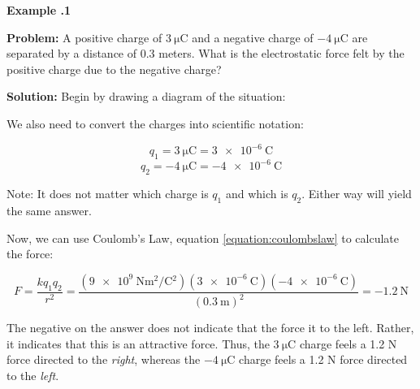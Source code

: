 	\begin{mdframed}[backgroundcolor=blue!10!white]
		\begin{center}
			
			
			\textbf{Example \thesection.1}	
		\end{center}
		\vspace{0.1in}
		\textbf{Problem: } A positive charge of $\SI{3}{\micro\coulomb}$ and a negative charge of $\SI{-4}{\micro\coulomb}$ are separated by a distance of 0.3 meters.  What is the electrostatic force felt by the positive charge due to the negative charge?
		
		\vspace{0.2in}
		
		
		
		
		
		\textbf{Solution:} 
		Begin by drawing a diagram of the situation: 
		
		
			\begin{center}
			\end{center}			

		We also need to convert the charges into scientific notation:
		
		\begin{equation*}
		q_1 = \SI{3}{\micro\coulomb} = \SI{3e-6}{\coulomb}
		\end{equation*}	
		\begin{equation*}
		q_2 = \SI{-4}{\micro\coulomb} = \SI{-4e-6}{\coulomb}
		\end{equation*}	
		
		Note: It does not matter which charge is $q_1$ and which is $q_2$.  Either way will yield the same answer.  
		
		Now, we can use Coulomb's Law, equation \ref{equation:coulombslaw} to calculate the force:
		
			\begin{equation*}
		F = \frac{kq_1q_2}{r^2} = \frac{(\SI{9e9}{\N\m^2\per\coulomb^2})(\SI{3e-6}{\coulomb})(\SI{-4e-6}{\coulomb})}{(\SI{0.3}{\m})^2} = \boxed{\SI{-1.2}{\N}}
		\end{equation*}
		
		The negative on the answer does not indicate that the force it to the left.  Rather, it indicates that this is an attractive force.  Thus, the $\SI{3}{\micro\coulomb}$ charge feels a 1.2 N force directed to the \textit{right}, whereas the $\SI{-4}{\micro\coulomb}$ charge feels a 1.2 N force directed to the \textit{left}.
		
	\end{mdframed}
	
